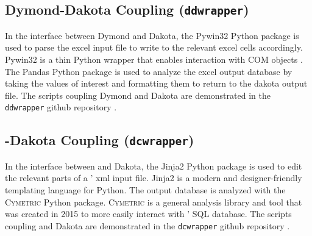 \subsection{Dymond-Dakota Coupling (\texttt{ddwrapper})}
In the interface between Dymond and Dakota, the Pywin32 
\cite{hammond_python_2000}
Python package is used to parse the excel input file to 
write to the relevant excel cells accordingly. 
Pywin32 is a thin Python wrapper that enables interaction 
with COM objects \cite{hammond_python_2000}. 
The Pandas \cite{mckinney_pandas:_2011} Python
package is used to analyze the excel output database 
by taking the values of interest and formatting them 
to return to the dakota output file.
The scripts coupling Dymond and Dakota are demonstrated in the 
\texttt{ddwrapper} github repository \cite{ddwrapper_doi_2019}.

\subsection{\Cyclus-Dakota Coupling (\texttt{dcwrapper})}
In the interface between \Cyclus and Dakota, 
the Jinja2 \cite{ronacher_welcome_2018} Python package is used 
to edit the relevant parts of a \Cyclus' xml input file. 
Jinja2 is a modern and designer-friendly templating 
language for Python. 
The \Cyclus output database is analyzed with
the \textsc{Cymetric} Python \cite{scopatz_cymetric_2015} package. 
\textsc{Cymetric} is a general analysis library and tool that was 
created in 2015 to more easily interact with \Cyclus' SQL 
database. 
The scripts coupling \Cyclus and Dakota are demonstrated in the 
\texttt{dcwrapper} github repository \cite{ddwrapper_doi_2019}.



